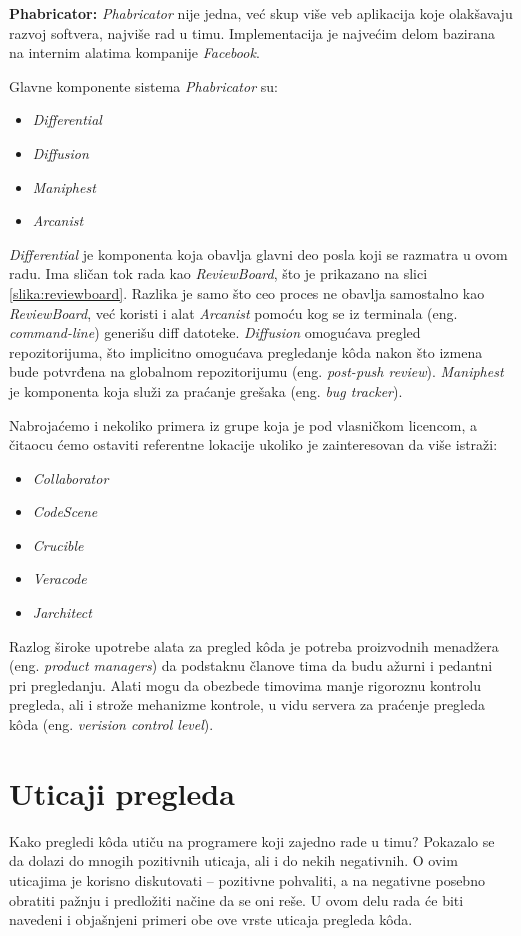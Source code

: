 \documentclass[a4paper]{article}
\begin{document}
\textbf{Phabricator:} 
\emph{Phabricator} nije jedna, već skup više veb aplikacija koje olakšavaju razvoj softvera, najviše rad u timu. Implementacija je najvećim delom bazirana na internim alatima kompanije \emph{Facebook}.

Glavne komponente sistema \emph{Phabricator} su:
\begin{itemize}
    \item \emph{Differential}
    \item \emph{Diffusion}
    \item \emph{Maniphest}
    \item \emph{Arcanist}
\end{itemize}
\emph{Differential} je komponenta koja obavlja glavni
deo posla koji se razmatra u ovom radu. 
Ima sličan tok rada kao \emph{ReviewBoard}, što je prikazano na slici \ref{slika:reviewboard}.
Razlika je samo što ceo proces ne obavlja
samostalno kao \emph{ReviewBoard}, već koristi
i alat \emph{Arcanist} pomoću kog se
iz terminala (eng. \emph{command-line})
generišu 
diff datoteke.
\emph{Diffusion} omogućava pregled repozitorijuma, što implicitno omogućava
pregledanje kôda nakon što izmena bude 
potvrđena na globalnom repozitorijumu
(eng. \emph{post-push review}).
\emph{Maniphest} je komponenta koja služi za praćanje
grešaka (eng. \emph{bug tracker}). \cite{maniphest}

Nabrojaćemo i nekoliko primera iz grupe koja je pod vlasničkom licencom, a čitaocu ćemo ostaviti referentne lokacije ukoliko je zainteresovan da više istraži:
\begin{itemize}
    \item \emph{Collaborator} \cite{collaborator}
    \item \emph{CodeScene} \cite{codescene}
    \item \emph{Crucible} \cite{crucible}
    \item \emph{Veracode} \cite{veracode}
    \item \emph{Jarchitect} \cite{jarchitect}
\end{itemize}

Razlog široke upotrebe alata za pregled kôda je 
potreba proizvodnih menadžera (eng. \emph{product 
managers}) da podstaknu članove tima da budu ažurni
i pedantni pri pregledanju. Alati mogu da obezbede
timovima manje rigoroznu kontrolu pregleda, ali i strože mehanizme kontrole, u vidu servera za praćenje pregleda kôda (eng. \emph{verision control level}). \cite{bkspcr}



\section{Uticaji pregleda}
Kako pregledi kôda utiču na programere koji zajedno rade u timu? Pokazalo se da dolazi do mnogih pozitivnih uticaja, ali i do nekih negativnih. \cite{bkspcr} O ovim uticajima je korisno diskutovati -- pozitivne pohvaliti, a na negativne posebno obratiti pažnju i predložiti načine da se oni reše. U ovom delu rada će biti navedeni i objašnjeni primeri obe ove vrste uticaja pregleda kôda.
\end{document}
